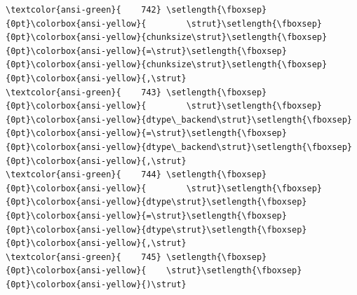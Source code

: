 \documentclass[11pt]{article}
\begin{document}
\begin{Verbatim}[commandchars=\\\{\}, frame=single, framerule=2mm, rulecolor=\color{outerrorbackground}]
\textcolor{ansi-green}{    742} \setlength{\fboxsep}{0pt}\colorbox{ansi-yellow}{        \strut}\setlength{\fboxsep}{0pt}\colorbox{ansi-yellow}{chunksize\strut}\setlength{\fboxsep}{0pt}\colorbox{ansi-yellow}{=\strut}\setlength{\fboxsep}{0pt}\colorbox{ansi-yellow}{chunksize\strut}\setlength{\fboxsep}{0pt}\colorbox{ansi-yellow}{,\strut}
\textcolor{ansi-green}{    743} \setlength{\fboxsep}{0pt}\colorbox{ansi-yellow}{        \strut}\setlength{\fboxsep}{0pt}\colorbox{ansi-yellow}{dtype\_backend\strut}\setlength{\fboxsep}{0pt}\colorbox{ansi-yellow}{=\strut}\setlength{\fboxsep}{0pt}\colorbox{ansi-yellow}{dtype\_backend\strut}\setlength{\fboxsep}{0pt}\colorbox{ansi-yellow}{,\strut}
\textcolor{ansi-green}{    744} \setlength{\fboxsep}{0pt}\colorbox{ansi-yellow}{        \strut}\setlength{\fboxsep}{0pt}\colorbox{ansi-yellow}{dtype\strut}\setlength{\fboxsep}{0pt}\colorbox{ansi-yellow}{=\strut}\setlength{\fboxsep}{0pt}\colorbox{ansi-yellow}{dtype\strut}\setlength{\fboxsep}{0pt}\colorbox{ansi-yellow}{,\strut}
\textcolor{ansi-green}{    745} \setlength{\fboxsep}{0pt}\colorbox{ansi-yellow}{    \strut}\setlength{\fboxsep}{0pt}\colorbox{ansi-yellow}{)\strut}


\end{Verbatim}
\end{document}
